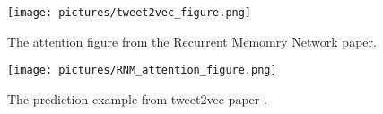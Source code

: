 \documentclass[11pt]{article}
\begin{document}
%   
%
%
%

\begin{figure}[htb]
  \begin{center}
     \scalebox{0.3}
      {\texttt{[image: pictures/tweet2vec\_figure.png]}}
      \caption{The attention figure from the Recurrent Memomry Network paper. }
      \label{fig:learning_rate}
     \end{center}
\vspace{-0.5cm}
\end{figure}



\begin{figure}[htb]
  \begin{center}
     \scalebox{0.3}
      {\texttt{[image: pictures/RNM\_attention\_figure.png]}}
   
      \caption{The prediction example from tweet2vec paper \cite{dhingra-EtAl:2016:P16-2}. }
      \label{fig:learning_rate}
     \end{center}
\vspace{-0.5cm}
\end{figure}




\end{document}

